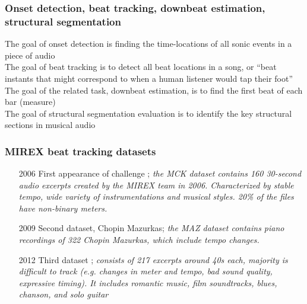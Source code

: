 \documentclass{beamer}
\begin{document}
\begin{frame}
	\frametitle{Onset detection, beat tracking, downbeat estimation, structural segmentation}
	The goal of onset detection is finding the time-locations of all sonic events in a piece of audio\\
	\vspace{1em}
	The goal of beat tracking is to detect all beat locations in a song, or ``beat instants that might correspond to when a human listener would tap their foot''\\
	\vspace{1em}
	The goal of the related task, downbeat estimation, is to find the first beat of each bar (measure)\\
	\vspace{1em}
	The goal of structural segmentation evaluation is to identify the key structural sections in musical audio
\end{frame}


\begin{frame}
	\frametitle{MIREX beat tracking datasets}
	\begin{enumerate}
		\item[2006]
			First appearance of challenge ; \textit{the MCK dataset contains 160 30-second audio excerpts created by the MIREX team in 2006. Characterized by stable tempo, wide variety of instrumentations and musical styles. 20\% of the files have non-binary meters.}
		\item[2009]
			Second dataset, Chopin Mazurkas; \textit{the MAZ dataset contains piano recordings of 322 Chopin Mazurkas, which include tempo changes.}
		\item[2012]
			Third dataset ; \textit{consists of 217 excerpts around 40s each, majority is difficult to track (e.g. changes in meter and tempo, bad sound quality, expressive timing). It includes romantic music, film soundtracks, blues, chanson, and solo guitar}
	\end{enumerate}
\end{frame}
\end{document}
